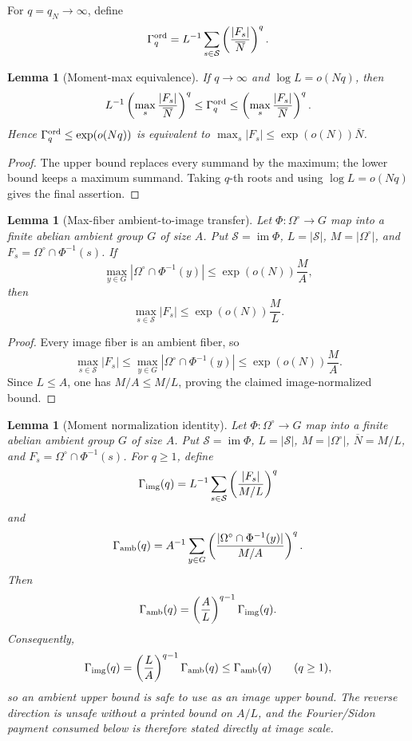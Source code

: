 \documentclass[11pt,a4paper]{amsart}
\numberwithin{equation}{section}
\newtheorem{lemma}[theorem]{Lemma}
\theoremstyle{remark}
\newcommand{\Scal}{\mathcal S}
\newcommand{\OmegaC}{\Omega^{\circ}}
\newcommand{\Gord}{\Gamma^{\rm ord}}
\newcommand{\barN}{\overline N}
\begin{document}
For \(q=q_N\to\infty\), define
\[
        \Gord_q=L^{-1}\sum_{s\in\Scal}\left(\frac{|F_s|}{\barN}\right)^q .
\]

\begin{lemma}[Moment-max equivalence]\label{lem:moment-max}
If \(q\to\infty\) and \(\log L=o(Nq)\), then
\[
        L^{-1}\left(\max_s\frac{|F_s|}{\barN}\right)^q
        \le \Gord_q
        \le
        \left(\max_s\frac{|F_s|}{\barN}\right)^q .
\]
Hence \(\Gord_q\le \exp(o(Nq))\) is equivalent to \(\max_s|F_s|\le\exp(o(N))\barN\).
\end{lemma}

\begin{proof}
The upper bound replaces every summand by the maximum; the lower bound keeps a maximum summand.  Taking \(q\)-th roots and using \(\log L=o(Nq)\) gives the final assertion.
\end{proof}

\begin{lemma}[Max-fiber ambient-to-image transfer]\label{lem:ambient-image-max}
Let \(\Phi:\OmegaC\to G\) map into a finite abelian ambient group \(G\) of size \(A\).  Put \(\Scal=\operatorname{im}\Phi\), \(L=|\Scal|\), \(M=|\OmegaC|\), and \(F_s=\OmegaC\cap\Phi^{-1}(s)\).  If
\[
        \max_{y\in G}|\OmegaC\cap\Phi^{-1}(y)|
        \le \exp(o(N))\frac{M}{A},
\]
then
\[
        \max_{s\in\Scal}|F_s|
        \le \exp(o(N))\frac{M}{L}.
\]
\end{lemma}

\begin{proof}
Every image fiber is an ambient fiber, so
\[
        \max_{s\in\Scal}|F_s|
        \le \max_{y\in G}|\OmegaC\cap\Phi^{-1}(y)|
        \le \exp(o(N))\frac{M}{A}.
\]
Since \(L\le A\), one has \(M/A\le M/L\), proving the claimed image-normalized bound.
\end{proof}

\begin{lemma}[Moment normalization identity]\label{lem:moment-normalization}
Let \(\Phi:\OmegaC\to G\) map into a finite abelian ambient group \(G\) of size \(A\).  Put \(\Scal=\operatorname{im}\Phi\), \(L=|\Scal|\), \(M=|\OmegaC|\), \(\barN=M/L\), and \(F_s=\OmegaC\cap\Phi^{-1}(s)\).  For \(q\ge1\), define
\[
        \Gamma_{\rm img}(q)
        =L^{-1}\sum_{s\in\Scal}\left(\frac{|F_s|}{M/L}\right)^q
\]
and
\[
        \Gamma_{\rm amb}(q)
        =A^{-1}\sum_{y\in G}
        \left(\frac{|\OmegaC\cap\Phi^{-1}(y)|}{M/A}\right)^q .
\]
Then
\[
        \Gamma_{\rm amb}(q)
        =\left(\frac{A}{L}\right)^{q-1}\Gamma_{\rm img}(q).
\]
Consequently,
\[
        \Gamma_{\rm img}(q)
        =\left(\frac{L}{A}\right)^{q-1}\Gamma_{\rm amb}(q)
        \le \Gamma_{\rm amb}(q)
        \qquad(q\ge1),
\]
so an ambient upper bound is safe to use as an image upper bound.  The reverse direction is unsafe without a printed bound on \(A/L\), and the Fourier/Sidon payment consumed below is therefore stated directly at image scale.
\end{lemma}
\end{document}
